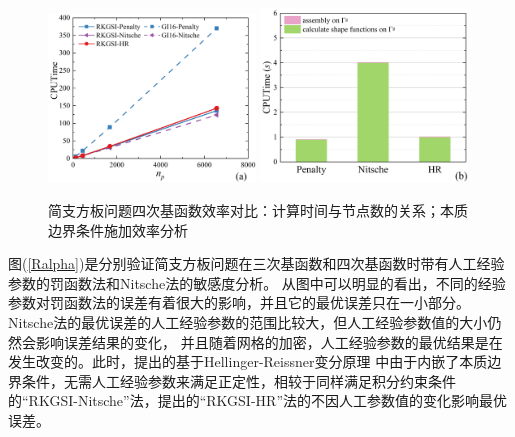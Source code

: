 \begin{figure}[H]
    \centering
    \begin{subcaptiongroup}
    \includegraphics[width=0.49\textwidth]{figure/PHR/R/Qcputime.png}
    \label{Qcputime}
    \includegraphics[width=0.49\textwidth]{figure/PHR/R/Qefficiency.png}
    \label{Qefficiency}
    \end{subcaptiongroup}
\caption{简支方板问题四次基函数效率对比：计算时间与节点数的关系；本质边界条件施加效率分析}
\label{RQcputime}
\end{figure}
图(\ref{Ralpha})是分别验证简支方板问题在三次基函数和四次基函数时带有人工经验参数的罚函数法和Nitsche法的敏感度分析。
从图中可以明显的看出，不同的经验参数对罚函数法的误差有着很大的影响，并且它的最优误差只在一小部分。
Nitsche法的最优误差的人工经验参数的范围比较大，但人工经验参数值的大小仍然会影响误差结果的变化，
并且随着网格的加密，人工经验参数的最优结果是在发生改变的。此时，提出的基于Hellinger-Reissner变分原理
中由于内嵌了本质边界条件，无需人工经验参数来满足正定性，相较于同样满足积分约束条件的“RKGSI-Nitsche”法，提出的“RKGSI-HR”法的不因人工参数值的变化影响最优误差。
